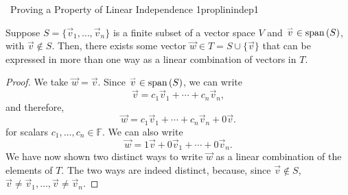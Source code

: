         \begin{example}{\Difficulty\,\Difficulty\,\,Proving a Property of Linear Independence 1}{proplinindep1}
            
            Suppose \(S=\{\vec{v}_1,\ldots,\vec{v}_n\}\) is a finite subset of a vector space \(V\) and \(\overset{_{\rightharpoonup}}{v}\in\text{span\,}(S)\), with \(\vec{v}\nin S\). Then, there exists some vector \(\vec{w}\in T=S\cup\{\vec{v}\}\) that can be expressed in more than one way as a linear combination of vectors in \(T\).
            \begin{proof}
                We take \(\vec{w}=\vec{v}\). Since \(\overset{_{\rightharpoonup}}{v}\in\text{span\,}(S)\), we can write
                \begin{equation*}
                    \vec{v}=c_1\vec{v}_1+\cdots+c_n\vec{v}_n,
                \end{equation*}
                and therefore, 
                \begin{equation*}
                    \vec{w}=c_1\vec{v}_1+\cdots+c_n\vec{v}_n+0\vec{v}.
                \end{equation*}
                for scalars \(c_1,\ldots,c_n\in\mathbb{F}\). We can also write
                \begin{equation*}
                    \vec{w}=1\vec{v}+0\vec{v}_1+\cdots+0\vec{v}_n.
                \end{equation*}
                We have now shown two distinct ways to write \(\vec{w}\) as a linear combination of the elements of \(T\). The two ways are indeed distinct, because, since \(\vec{v}\nin S\), \(\vec{v}\neq\vec{v}_1,\ldots,\vec{v}\neq\vec{v}_n\).
            \end{proof}
            
        \end{example}
        \pagebreak
